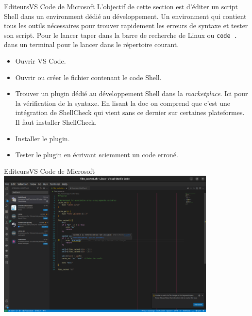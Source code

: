 \documentclass{beamer}
\begin{document}
    \begin{frame}{Editeurs}{VS Code de Microsoft}
        L'objectif de cette section est d'éditer un script Shell dans un environment dédié au développement.
        Un environment qui contient tous les outils nécessaires pour trouver rapidement les erreurs de syntaxe et tester son script.
        \bigbreak
        Pour le lancer taper  dans la barre de recherche de Linux ou \lstinline{code .} dans un terminal pour le lancer dans le répertoire courant.
        \begin{itemize}
            \item Ouvrir VS Code.
            \item Ouvrir ou créer le fichier contenant le code Shell.
            \item Trouver un plugin dédié au développement Shell dans la \textit{marketplace}.
            Ici  pour la vérification de la syntaxe.
            En lisant la doc on comprend que c'est une intégration de ShellCheck qui vient sans ce dernier sur certaines plateformes.
            Il faut installer ShellCheck.
            \item Installer le plugin.
            \item Tester le plugin en écrivant sciemment un code erroné.
        \end{itemize}
    \end{frame}

    \begin{frame}{Editeurs}{VS Code de Microsoft}
        \centering
        \includegraphics[width=11cm]{image/shellcheck-install}
    \end{frame}
\end{document}
